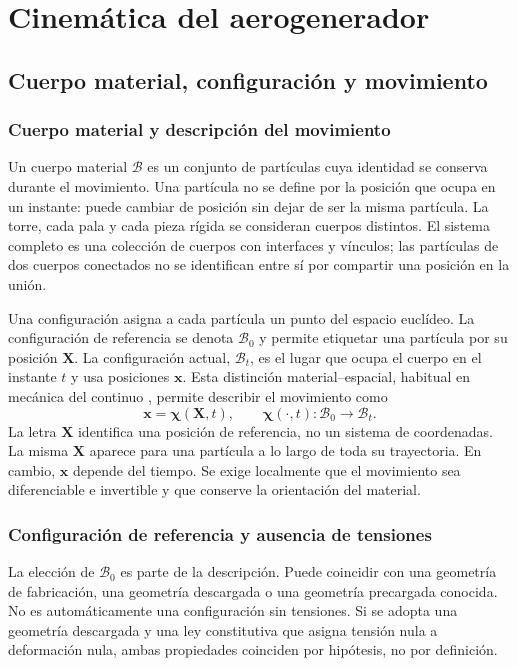 \documentclass[11pt,a4paper,oneside]{report}
\newcommand{\vct}[1]{\bm{#1}}
\begin{document}
\chapter{Cinemática del aerogenerador}
\label{ch:cinematica}
\section{Cuerpo material, configuración y movimiento}
\subsection{Cuerpo material y descripción del movimiento}
Un cuerpo material $\mathcal B$ es un conjunto de partículas cuya identidad se conserva durante el movimiento. Una partícula no se define por la posición que ocupa en un instante: puede cambiar de posición sin dejar de ser la misma partícula. La torre, cada pala y cada pieza rígida se consideran cuerpos distintos. El sistema completo es una colección de cuerpos con interfaces y vínculos; las partículas de dos cuerpos conectados no se identifican entre sí por compartir una posición en la unión.

Una configuración asigna a cada partícula un punto del espacio euclídeo. La configuración de referencia se denota $\mathcal B_0$ y permite etiquetar una partícula por su posición $\vct X$. La configuración actual, $\mathcal B_t$, es el lugar que ocupa el cuerpo en el instante $t$ y usa posiciones $\vct x$. Esta distinción material--espacial, habitual en mecánica del continuo \cite{holzapfel}, permite describir el movimiento como
\begin{equation}
 \vct x=\vct\chi(\vct X,t),\qquad
 \vct\chi(\cdot,t):\mathcal B_0\longrightarrow\mathcal B_t.
 \label{eq:chi}
\end{equation}
La letra $\vct X$ identifica una posición de referencia, no un sistema de coordenadas. La misma $\vct X$ aparece para una partícula a lo largo de toda su trayectoria. En cambio, $\vct x$ depende del tiempo. Se exige localmente que el movimiento sea diferenciable e invertible y que conserve la orientación del material.

\subsection{Configuración de referencia y ausencia de tensiones}
La elección de $\mathcal B_0$ es parte de la descripción. Puede coincidir con una geometría de fabricación, una geometría descargada o una geometría precargada conocida. No es automáticamente una configuración sin tensiones. Si se adopta una geometría descargada y una ley constitutiva que asigna tensión nula a deformación nula, ambas propiedades coinciden por hipótesis, no por definición.
\end{document}
